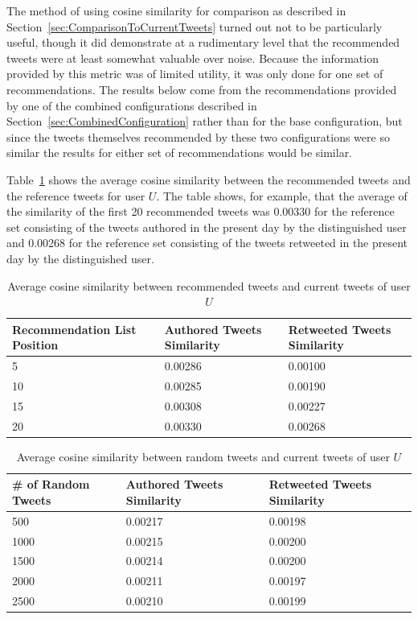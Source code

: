 The method of using cosine similarity for comparison as described in Section~\ref{sec:ComparisonToCurrentTweets} turned out not to be particularly useful, though it did demonstrate at a rudimentary level that the recommended tweets were at least somewhat valuable over noise. Because the information provided by this metric was of limited utility, it was only done for one set of recommendations. The results below come from the recommendations provided by one of the combined configurations described in Section~\ref{sec:CombinedConfiguration} rather than for the base configuration, but since the tweets themselves recommended by these two configurations were so similar the results for either set of recommendations would be similar.

Table~\ref{tab:RecommendedTweetSimilarity} shows the average cosine similarity between the recommended tweets and the reference tweets for user $U$. The table shows, for example, that the average of the similarity of the first 20 recommended tweets was 0.00330 for the reference set consisting of the tweets authored in the present day by the distinguished user and 0.00268 for the reference set consisting of the tweets retweeted in the present day by the distinguished user.


\begin{table}
\centering
\begin{tabular}{p{3.5cm}|p{4cm}|p{4cm}}
{\bf Recommendation List Position} & {\bf Authored Tweets Similarity} & {\bf Retweeted Tweets Similarity} \\ \hline
 5 & 0.00286 & 0.00100 \\ \hline
10 & 0.00285 & 0.00190 \\ \hline
15 & 0.00308 & 0.00227 \\ \hline
20 & 0.00330 & 0.00268 \\
\end{tabular}
\caption[Cosine similarity of recommended tweets]{Average cosine similarity between recommended tweets and current tweets of user $U$}
\label{tab:RecommendedTweetSimilarity}
\end{table}

\begin{table}
\centering
\begin{tabular}{p{3.25cm}|p{4cm}|p{4cm}}
{\bf \# of Random Tweets} & {\bf Authored Tweets Similarity} & {\bf Retweeted Tweets Similarity} \\ \hline
 500 & 0.00217 & 0.00198 \\ \hline
1000 & 0.00215  & 0.00200 \\ \hline
1500 & 0.00214 & 0.00200 \\ \hline
2000 & 0.00211 & 0.00197 \\ \hline
2500 & 0.00210 & 0.00199 \\
\end{tabular}
\caption[Cosine similarity of random tweets]{Average cosine similarity between random tweets and current tweets of user $U$}
\label{tab:RandomTweetSimilarity}
\end{table}


